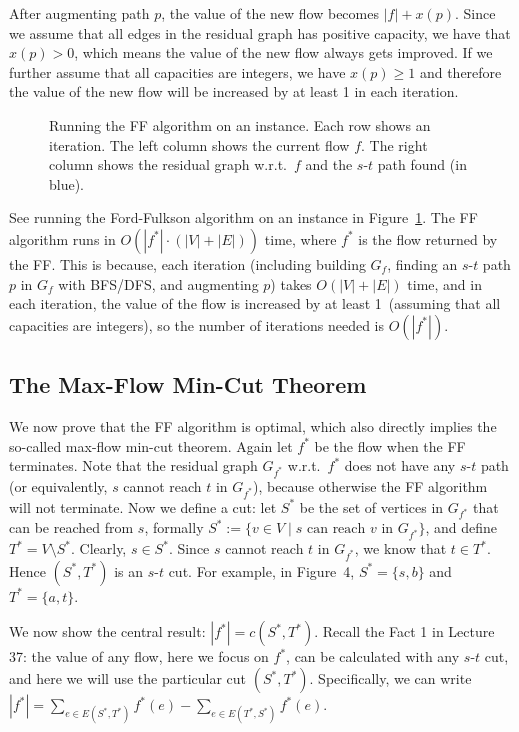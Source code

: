 After augmenting path $p$, the value of the new flow becomes $|f|+x(p)$. Since we
assume that all edges in the residual graph has positive capacity, we have that
$x(p) > 0$, which means the value of the new flow always gets improved. If we
further assume that all capacities are integers, we have $x(p) \ge 1$ and therefore
the value of the new flow will be increased by at least 1 in each iteration.

\begin{figure}[h]
\centering{}
\caption{Running the FF algorithm on an instance. Each row shows an iteration. The left column shows
the current flow $f$. The right column shows the residual graph w.r.t.\ $f$ and the $s$-$t$ path found (in blue).}
\label{fig:ff}
\end{figure}

See running the Ford-Fulkson algorithm on an instance in Figure~\ref{fig:ff}.
The FF algorithm runs in $O(|f^*|\cdot(|V|+|E|))$ time,
where $f^*$ is the flow returned by the FF. 
This is because, each iteration (including building $G_f$, finding an $s$-$t$ path $p$ in $G_f$
with BFS/DFS, and augmenting $p$) takes $O(|V|+|E|)$ time, and in each iteration,
the value of the flow is increased by at least 1~(assuming that all capacities are integers),
so the number of iterations needed is $O(|f^*|)$.


\subsection*{The Max-Flow Min-Cut Theorem}

We now prove that the FF algorithm is optimal, which also directly implies the so-called max-flow min-cut
theorem.  Again let $f^*$ be the flow when the FF terminates. Note that the residual graph $G_{f^*}$ w.r.t.\ $f^*$ does
not have any $s$-$t$ path (or equivalently, $s$ cannot reach $t$ in $G_{f^*}$), because otherwise the FF algorithm will
not terminate. Now we define a cut: let $S^*$ be the set of vertices in  $G_{f^*}$ that can be reached from $s$, formally 
$S^* := \{v\in V\mid s \textrm{ can reach $v$ in } G_{f^*} \}$,
and define $T^* = V\setminus S^*$.
Clearly, $s\in S^*$.  Since $s$ cannot reach $t$ in $G_{f^*}$, we know that $t\in T^*$. Hence
$(S^*, T^*)$ is an $s$-$t$ cut. For example, in Figure~4, $S^* = \{s,b\}$ and $T^* = \{a,t\}$.

We now show the central result: $|f^*| = c(S^*,T^*)$. Recall the Fact 1 in Lecture
37: the value of any flow, here we focus on $f^*$, can be calculated with any $s$-$t$
cut, and here we will use the particular cut $(S^*,T^*)$.
Specifically, we can write $|f^*| = \sum_{e\in E(S^*, T^*)} f^*(e) - \sum_{e\in E(T^*, S^*)} f^*(e)$.

